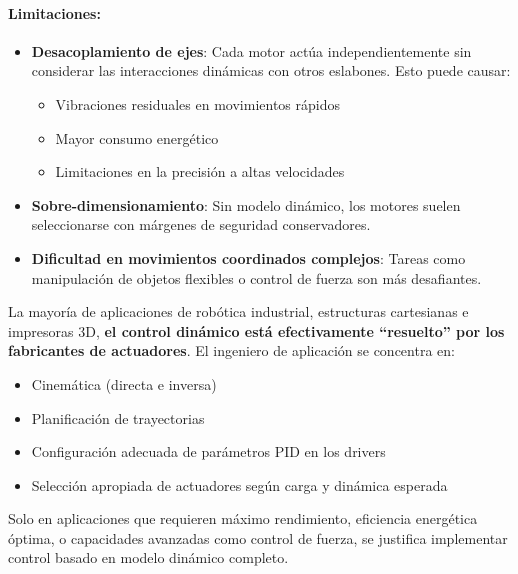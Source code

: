 \paragraph{Limitaciones:}

\begin{itemize}
    \item \textbf{Desacoplamiento de ejes}: Cada motor actúa independientemente sin considerar las interacciones dinámicas con otros eslabones. Esto puede causar:
    \begin{itemize}
        \item Vibraciones residuales en movimientos rápidos
        \item Mayor consumo energético
        \item Limitaciones en la precisión a altas velocidades
    \end{itemize}
    
    \item \textbf{Sobre-dimensionamiento}: Sin modelo dinámico, los motores suelen seleccionarse con márgenes de seguridad conservadores.
    
    \item \textbf{Dificultad en movimientos coordinados complejos}: Tareas como manipulación de objetos flexibles o control de fuerza son más desafiantes.
\end{itemize}

La mayoría de aplicaciones de robótica industrial, estructuras cartesianas e impresoras 3D, \textbf{el control dinámico está efectivamente ``resuelto'' por los fabricantes de actuadores}. El ingeniero de aplicación se concentra en:

\begin{itemize}
    \item Cinemática (directa e inversa)
    \item Planificación de trayectorias
    \item Configuración adecuada de parámetros PID en los drivers
    \item Selección apropiada de actuadores según carga y dinámica esperada
\end{itemize}

Solo en aplicaciones que requieren máximo rendimiento, eficiencia energética óptima, o capacidades avanzadas como control de fuerza, se justifica implementar control basado en modelo dinámico completo.
